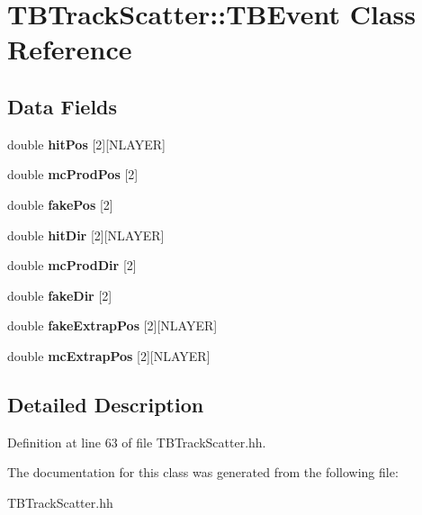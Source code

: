 \section{T\-B\-Track\-Scatter\-:\-:T\-B\-Event Class Reference}
\label{classTBTrackScatter_1_1TBEvent}
\subsection*{Data Fields}
\begin{DoxyCompactItemize}
\item 
double {\bfseries hit\-Pos} [2][N\-L\-A\-Y\-E\-R]\label{classTBTrackScatter_1_1TBEvent_a52e8168b36764a718e4fe6c0ad132951}

\item 
double {\bfseries mc\-Prod\-Pos} [2]\label{classTBTrackScatter_1_1TBEvent_acb19b8e5107a14348b0900faf9de9037}

\item 
double {\bfseries fake\-Pos} [2]\label{classTBTrackScatter_1_1TBEvent_ad2224c9b948a99a94923b57b71e709b3}

\item 
double {\bfseries hit\-Dir} [2][N\-L\-A\-Y\-E\-R]\label{classTBTrackScatter_1_1TBEvent_ae11e105e2f208225844097be44c2209f}

\item 
double {\bfseries mc\-Prod\-Dir} [2]\label{classTBTrackScatter_1_1TBEvent_a6b0ad06b6859dfa4d3b33ce6ceab37ed}

\item 
double {\bfseries fake\-Dir} [2]\label{classTBTrackScatter_1_1TBEvent_ab9a7089d86050e755f701ca3c9a530ad}

\item 
double {\bfseries fake\-Extrap\-Pos} [2][N\-L\-A\-Y\-E\-R]\label{classTBTrackScatter_1_1TBEvent_aead73b11610a89b2bec00b298d2c4a54}

\item 
double {\bfseries mc\-Extrap\-Pos} [2][N\-L\-A\-Y\-E\-R]\label{classTBTrackScatter_1_1TBEvent_a51446ed1379b77dd2bda8d177886fede}

\end{DoxyCompactItemize}


\subsection{Detailed Description}


Definition at line 63 of file T\-B\-Track\-Scatter.\-hh.



The documentation for this class was generated from the following file\-:\begin{DoxyCompactItemize}
\item 
T\-B\-Track\-Scatter.\-hh\end{DoxyCompactItemize}
